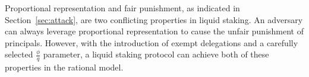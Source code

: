 Proportional representation and fair punishment, as indicated in
Section~\ref{sec:attack}, are two conflicting properties in liquid
staking. An adversary can always leverage proportional
representation to cause the unfair punishment of principals.
However, with the introduction of exempt delegations and a carefully selected
$\frac{\phi}{q}$ parameter, a liquid staking protocol can achieve both of these
properties in the rational model.

%
%

